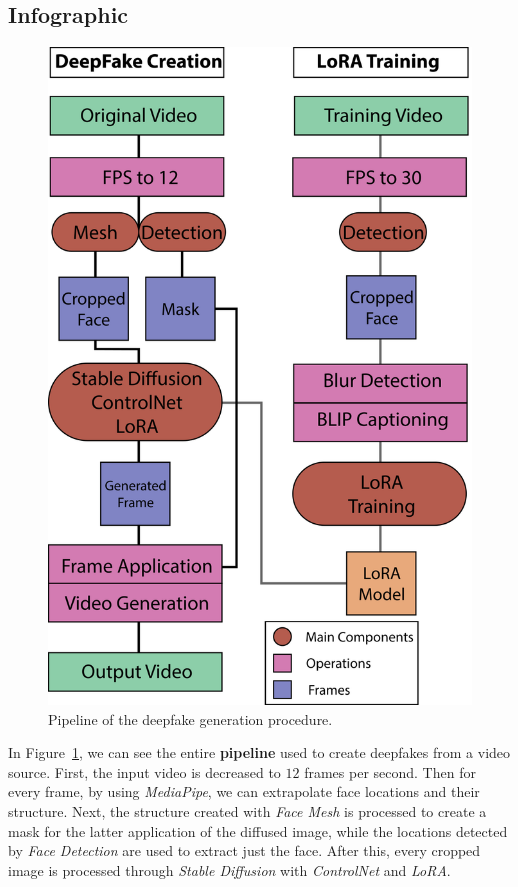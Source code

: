 \documentclass[preprint]{elsarticle}
\begin{document}
\subsection{Infographic}\label{sec:project_info}

\begin{figure}[t]
	\centering
	\includegraphics[scale=0.65]{img/svg/Info.png}
	\caption{Pipeline of the deepfake generation procedure.}\label{fig:project}
\end{figure}




In Figure~\ref{fig:project}, we can see the entire \textbf{pipeline} used to create deepfakes from a video source. 
First, the input video is decreased to $12$ frames per second. Then for every frame, by using \emph{MediaPipe}, we can extrapolate face locations and their structure.  Next, the structure created with \emph{Face Mesh} is processed to create a mask for the latter application of the diffused image, 
while the locations detected by \emph{Face Detection} are used to extract just the face. After this, every cropped image is processed through \emph{Stable Diffusion} with \emph{ControlNet} and \emph{LoRA}. 
\end{document}
